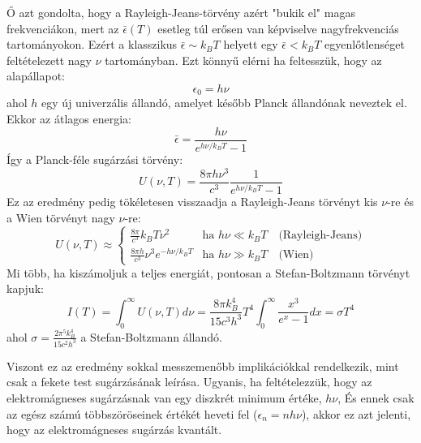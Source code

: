 \documentclass[../main.tex]{subfiles}
\begin{document}
Ő azt gondolta, hogy a Rayleigh-Jeans-törvény azért "bukik el" magas frekvenciákon, mert az $\bar{\epsilon}(T)$ esetleg túl erősen van képviselve nagyfrekvenciás tartományokon.
Ezért a klasszikus $\bar{\epsilon} \sim k_BT$ helyett egy $\bar{\epsilon} < k_BT$ egyenlőtlenséget feltételezett nagy $\nu$ tartományban. Ezt könnyű elérni ha feltesszük, hogy az alapállapot:
\begin{equation}
    \epsilon_0 = h \nu
\end{equation}
ahol $h$ egy új univerzális állandó, amelyet később Planck állandónak neveztek el. Ekkor az átlagos energia:
\begin{equation}
    \bar{\epsilon} = \frac{h \nu}{e^{h \nu / k_BT} - 1}
\end{equation}
Így a Planck-féle sugárzási törvény:
\begin{equation}
    \boxed{U(\nu, T) = \frac{8 \pi h \nu^3}{c^3} \frac{1}{e^{h \nu / k_BT} - 1}}
\end{equation}
Ez az eredmény pedig tökéletesen visszaadja a Rayleigh-Jeans törvényt kis $\nu$-re és a Wien törvényt nagy $\nu$-re:
\begin{equation}
    U(\nu, T) \approx \begin{cases}
    \frac{8 \pi}{c^3} k_BT \nu^2 & \text{ha } h \nu \ll k_BT \quad \text{(Rayleigh-Jeans)} \\
    \frac{8 \pi h}{c^3} \nu^3 e^{-h \nu / k_BT} & \text{ha } h \nu \gg k_BT \quad \text{(Wien)}
    \end{cases}
\end{equation}
Mi több, ha kiszámoljuk a teljes energiát, pontosan a Stefan-Boltzmann törvényt kapjuk:
\begin{equation}
    I(T) = \int_0^{\infty} U(\nu, T) d\nu = \frac{8 \pi k_B^4}{15 c^3 h^3} T^4 \int_{0}^{\infty} \frac{x^3}{e^x - 1} dx = \sigma T^4
\end{equation}
ahol $\sigma = \frac{2 \pi^5 k_B^4}{15 c^2 h^3}$ a Stefan-Boltzmann állandó.

Viszont ez az eredmény sokkal messzemenőbb implikációkkal rendelkezik, mint csak a fekete test sugárzásának leírása. Ugyanis, ha feltételezzük, hogy az elektromágneses sugárzásnak van egy diszkrét minimum értéke, $h \nu$, 
És ennek csak az egész számú többszöröseinek értékét heveti fel ($\epsilon_n = n h \nu$), akkor ez azt jelenti, hogy az elektromágneses sugárzás kvantált. 
\end{document}
